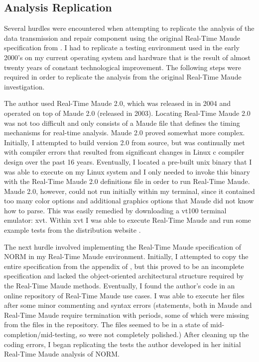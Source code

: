 \documentclass[10pt, journal]{IEEEtran}
\begin{document}
\subsection{Analysis Replication}

Several hurdles were encountered when attempting to replicate the analysis of the data transmission and repair component using the original Real-Time Maude specification from \cite{Lien2004}. I had to replicate a testing environment used in the early 2000's on my current operating system and hardware that is the result of almost twenty years of constant technological improvement. The following steps were required in order to replicate the analysis from the original Real-Time Maude investigation.

The author used Real-Time Maude 2.0, which was released in in 2004 and operated on top of Maude 2.0 (released in 2003). Locating Real-Time Maude 2.0 was not too difficult and only consists of a Maude file that defines the timing mechanisms for real-time analysis. Maude 2.0 proved somewhat more complex. Initially, I attempted to build version 2.0 from source, but was continually met with compiler errors that resulted from significant changes in Linux c compiler design over the past 16 years. Eventually, I located a pre-built unix binary that I was able to execute on my Linux system and I only needed to invoke this binary with the Real-Time Maude 2.0 definitions file in order to run Real-Time Maude. Maude 2.0, however, could not run initially within my terminal, since it contained too many color options and additional graphics options that Maude did not know how to parse. This was easily remedied by downloading a vt100 terminal emulator: xvt. Within xvt I was able to execute Real-Time Maude and run some example tests from the distribution website \cite{rtmaudeUrl}.

The next hurdle involved implementing the Real-Time Maude specification of NORM in my Real-Time Maude environment. Initially, I attempted to copy the entire specification from the appendix of \cite{Lien2004}, but this proved to be an incomplete specification and lacked the object-oriented architectural structure required by the Real-Time Maude methods. Eventually, I found the author's code in an online repository of Real-Time Maude use cases. I was able to execute her files after some minor commenting and syntax errors (statements, both in Maude and Real-Time Maude require termination with periods, some of which were missing from the files in the repository. The files seemed to be in a state of mid-completion/mid-testing, so were not completely polished.) After cleaning up the coding errors, I began replicating the tests the author developed in her initial Real-Time Maude analysis of NORM.
\end{document}
